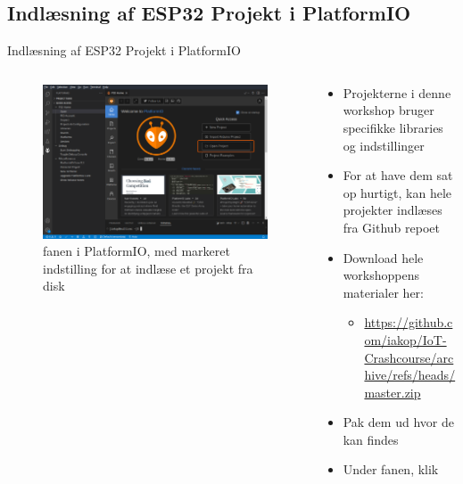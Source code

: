 \documentclass[aspectratio=169]{beamer}
\begin{document}
\subsection{Indlæsning af ESP32 Projekt i PlatformIO}
\begin{frame}{Indlæsning af ESP32 Projekt i PlatformIO}
\begin{columns}
	\begin{column}{0.5\textwidth}
		\begin{figure}
  			\includegraphics[width=\textwidth,keepaspectratio=true]{assets/pictures/pio-import.png}
  			\caption{ fanen i PlatformIO, med markeret indstilling for at indlæse et projekt fra disk}
  			\label{fig:pio-project4}
		\end{figure}
	\end{column}
	\begin{column}{0.5\textwidth}
		\begin{textBox}
			\begin{itemize}
				\item Projekterne i denne workshop bruger specifikke libraries og indstillinger
				\item For at have dem sat op hurtigt, kan hele projekter indlæses fra Github repoet
				\item Download hele workshoppens materialer her:
				\begin{itemize}
					\item \small\url{https://github.com/iakop/IoT-Crashcourse/archive/refs/heads/master.zip}
				\end{itemize}
				\item Pak dem ud hvor de kan findes
				\item Under  fanen, klik 
			\end{itemize}
		\end{textBox}
	\end{column}
\end{columns}
\end{frame}
\end{document}
